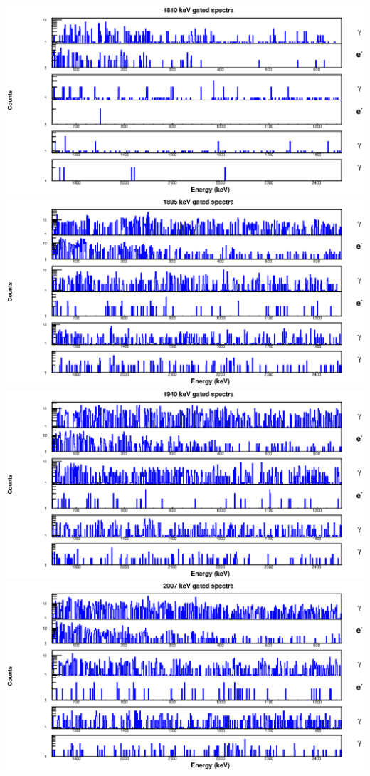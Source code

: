\begin{landscape}
\includegraphics[scale=1.2]{154Gd_Appendix/1810_combined.eps}
\includegraphics[scale=1.2]{154Gd_Appendix/1895_combined.eps}
\includegraphics[scale=1.2]{154Gd_Appendix/1940_combined.eps}
\includegraphics[scale=1.2]{154Gd_Appendix/2007_combined.eps}

\end{landscape}
